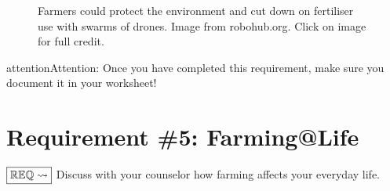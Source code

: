 \documentclass[letterpaper,10pt,english,openany,oneside]{sphinxmanual}
\let\sphinxpxdimen\pdfpxdimen\else\newdimen\sphinxpxdimen
\begin{document}
\begin{figure}[htbp]
\centering
\capstart

\noindent\sphinxincludegraphics[width=600\sphinxpxdimen]{{EUFarm}.jpg}
\caption{Farmers could protect the environment and cut down on fertiliser use with swarms of drones. Image from robohub.org. Click on image for full credit.}\label{\detokenize{requirement4:id1}}\end{figure}

\begin{sphinxadmonition}{attention}{Attention:}
Once you have completed this requirement, make sure you document it in your worksheet!
\end{sphinxadmonition}


\chapter{Requirement \#5: Farming@Life}
\label{\detokenize{requirement5:requirement-5-farming-life}}\label{\detokenize{requirement5::doc}}
\(\boxed{\mathbb{REQ}\Large \rightsquigarrow}\) Discuss with your counselor how farming affects your everyday life.
\end{document}
